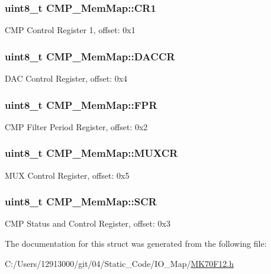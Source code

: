 \subsubsection[{C\+R1}]{\setlength{\rightskip}{0pt plus 5cm}uint8\+\_\+t C\+M\+P\+\_\+\+Mem\+Map\+::\+C\+R1}\label{struct_c_m_p___mem_map_ab790f5d18ef53ba0c9cfc2b5f3ce6668}
C\+M\+P Control Register 1, offset\+: 0x1 \hypertarget{struct_c_m_p___mem_map_a64ad86546fe53058b6fdd5ca1252f7c2}{}
\subsubsection[{D\+A\+C\+C\+R}]{\setlength{\rightskip}{0pt plus 5cm}uint8\+\_\+t C\+M\+P\+\_\+\+Mem\+Map\+::\+D\+A\+C\+C\+R}\label{struct_c_m_p___mem_map_a64ad86546fe53058b6fdd5ca1252f7c2}
D\+A\+C Control Register, offset\+: 0x4 \hypertarget{struct_c_m_p___mem_map_aa793447f43fa77759b6eaf1620bed4bc}{}
\subsubsection[{F\+P\+R}]{\setlength{\rightskip}{0pt plus 5cm}uint8\+\_\+t C\+M\+P\+\_\+\+Mem\+Map\+::\+F\+P\+R}\label{struct_c_m_p___mem_map_aa793447f43fa77759b6eaf1620bed4bc}
C\+M\+P Filter Period Register, offset\+: 0x2 \hypertarget{struct_c_m_p___mem_map_a3b48de300c4b4116ebb942659a2948a2}{}
\subsubsection[{M\+U\+X\+C\+R}]{\setlength{\rightskip}{0pt plus 5cm}uint8\+\_\+t C\+M\+P\+\_\+\+Mem\+Map\+::\+M\+U\+X\+C\+R}\label{struct_c_m_p___mem_map_a3b48de300c4b4116ebb942659a2948a2}
M\+U\+X Control Register, offset\+: 0x5 \hypertarget{struct_c_m_p___mem_map_a3fe55f0243869b50fc54acb9c194d970}{}
\subsubsection[{S\+C\+R}]{\setlength{\rightskip}{0pt plus 5cm}uint8\+\_\+t C\+M\+P\+\_\+\+Mem\+Map\+::\+S\+C\+R}\label{struct_c_m_p___mem_map_a3fe55f0243869b50fc54acb9c194d970}
C\+M\+P Status and Control Register, offset\+: 0x3 

The documentation for this struct was generated from the following file\+:\begin{DoxyCompactItemize}
\item 
C\+:/\+Users/12913000/git/04/\+Static\+\_\+\+Code/\+I\+O\+\_\+\+Map/\hyperlink{_m_k70_f12_8h}{M\+K70\+F12.\+h}\end{DoxyCompactItemize}
